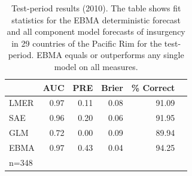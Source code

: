 \documentclass[12pt,fullpage,endnotes]{article}
\begin{document}
\begin{table}[h!]
\small
\begin{center}
  \caption{\footnotesize Test-period results (2010).  The table shows
    fit statistics for the EBMA deterministic forecast and all
    component model forecasts of insurgency in 29 countries of the
    Pacific Rim for the test-period.  EBMA equals or outperforms any single model on all
    measures.}\label{OutSam1}
\begin{tabular}{lrrrrr}
  \toprule
 & AUC & PRE & Brier & \% Correct   \\ 
  \midrule
LMER & 0.97 & 0.11 & 0.08 & 91.09\\
SAE  & 0.96 & 0.20 & 0.06 & 91.95\\
GLM & 0.72 & 0.00 & 0.09 & 89.94\\
EBMA & 0.97 & 0.43 & 0.04 & 94.25 \\
   \bottomrule
n=348 \\
\end{tabular}
\end{center}
\end{table}
\end{document}
